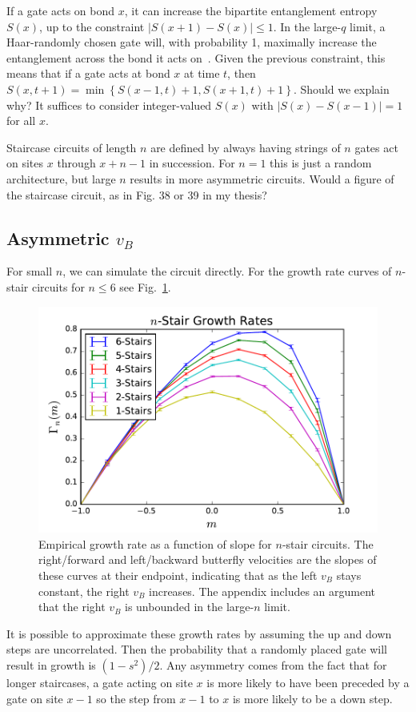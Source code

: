 \documentclass[aps,prx,reprint,superscriptaddress, longbibliography]{revtex4-1}
\newcommand{\charlie}[1]{ {\color{Magenta} {{#1}}}}
\begin{document}
If a gate acts on bond $x$, it can increase the bipartite entanglement entropy $S(x)$, up to the constraint $|S(x + 1) - S(x)| \le 1$. In the large-$q$ limit, a Haar-randomly chosen gate will, with probability 1, maximally increase the entanglement across the bond it acts on~\cite{nahum2017quantum}. Given the previous constraint, this means that if a gate acts at bond $x$ at time $t$, then $S(x, t+1) = \min\left\lbrace S(x-1,t)+1, S(x+1,t)+1\right\rbrace$. \charlie{Should we explain why?} It suffices to consider integer-valued $S(x)$ with $|S(x)-S(x-1)|=1$ for all $x$. 

Staircase circuits of length $n$ are defined by always having strings of $n$ gates act on sites $x$ through $x+n-1$ in succession. For $n=1$ this is just a random architecture, but large $n$ results in more asymmetric circuits. \charlie{Would a figure of the staircase circuit, as in Fig. 38 or 39 in my thesis?}

\subsection{Asymmetric $v_B$}

For small $n$, we can simulate the circuit directly. For the growth rate curves of $n$-stair circuits for $n\le 6$ see Fig.~\ref{fig:compareRates}. 
\begin{figure}
	\includegraphics[width=\columnwidth]{compareRates.pdf}
	\caption{Empirical growth rate as a function of slope for $n$-stair circuits. The right/forward and left/backward butterfly velocities are the slopes of these curves at their endpoint, indicating that as the left $v_B$ stays constant, the right $v_B$ increases. The appendix includes an argument that the right $v_B$ is unbounded in the large-$n$ limit.}
	\label{fig:compareRates}
\end{figure}	
It is possible to approximate these growth rates by assuming the up and down steps are uncorrelated. Then the probability that a randomly placed gate will result in growth is $(1-s^2)/2$. Any asymmetry comes from the fact that for longer staircases, a gate acting on site $x$ is more likely to have been preceded by a gate on site $x-1$ so the step from $x-1$ to $x$ is more likely to be a down step.
\end{document}
